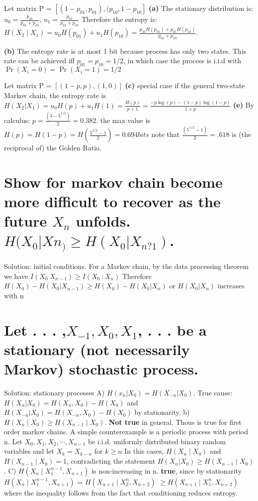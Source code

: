 \documentclass[10pt]{article}
\begin{document}
\begin{tiny}
\begin{multicols}{3}
Let matrix P = $[ (1-p_{01}, p_{01}), (p_{10}, 1-p_{10}]$ 
\textbf{(a)} The stationary distribution is: $u_0=\frac{p_{10}}{p_{01}+p_{10}}$, $u_1=\frac{p_{01}}{p_{01}+p_{10}}$
Therefore the entropy is: \( H(X_2 \mid X_1) = u_0H(p_{01})+u_1H(p_{10}) = \frac{p_{10}H(p_{01})+ p_{01}H(p_{10})}{p_{01}+p_{10}}. \)

\textbf{(b)} The entropy rate is at most 1 bit because process has only two states. This rate can be achieved iff \(p_{01}=p_{10}=1/2 \), in which case the process is i.i.d with \( \Pr(X_i = 0) =\Pr(X_i=1) = 1/2 \)

Let matrix P = $[ (1-p, p), (1, 0)]$ 
\textbf{(c)} special case if the general two-state Markov chain, the entropy rate is \( H(X_2 | X_1)=u_0H(p)+u_1H(1)=\frac{H(p)}{p+1} = \frac{-p\log(p)-(1-p)\log(1-p)}{1+p} \)
\textbf{(e)} By calculus: \( p=\frac{(3-5^{1/2})}{2}=0.382.\) the max value is \(H(p)=H(1-p)=H(\frac{5^{1/2}-1}{2}) = 0.694bits\)
note that \( \frac{(5^{1/2}-1)}{2} =.618\) is (the reciprocal of) the Golden Ratio.

\section*{Show for markov chain become more difficult to recover as the future $X_n$ unfolds. $H (X_0|Xn_) \ge H (X_0|X_{n?1})$.}
Solution: initial conditions. For a Markov chain, by the data processing theorem we have $I(X_0  \: X_{n-1}) \ge I(X_0 \ : X_n)$ Therefore $H(X_0) - H(X_0 | X_{n-1}) \ge H(X_0) - H(X_0 | X_n)$ or $H(X_0 | X_n)$  increases with n

\section*{Let	. . . ,$ X_{-1}, X_0, X_1$, . . . be	a stationary (not necessarily Markov) stochastic process.}
Solution: stationary processes A) $H(x_n | X_0) = H(X_{-n} | X_0).$ True cause: $H(X_n | X_0) = H(X_n,X_0) - H(X_0)$ and $H(X_{-n} | X_0) = H(X_{-n},X_0) - H(X_0)$ by stationarity.
b) \(H(X_n\mid X_0) \ge H(X_{n-1} \mid X_0). \) \textbf{Not true} in general. Thous is true for first order markov chains. A simple counterexample is a periodic process with period n. Let $X_0,X_1,X_2,\cdots,X_{n-1}$ be i.i.d. uniformly distributed binary random variables and let \(X_k =X_{k-n}\) for \( k \ge n \) In this cases, $H(X_n \mid X_0)$ and $H(X_{n-1} \mid X_0) = 1$, contradicting the statement $H(X_n | X_0) \ge H(X_{n-1} \mid X_0)$. C) \(H(X_n \mid X_1^{n-1}, X_{n+1}) \) is non-increasing in n. \textbf{true}, since by stationarity \(H(X_n \mid X_1^{n-1}, X_{n+1}) \) = \(H(X_{n+1} \mid X_2^{n}, X_{n+2}) \)  \( \ge H(X_{n+1} \mid X_1^{n}, X_{n+2}) \) where the inequality follows from the fact that conditioning reduces entropy.


\end{multicols}
\end{tiny}
\end{document}
